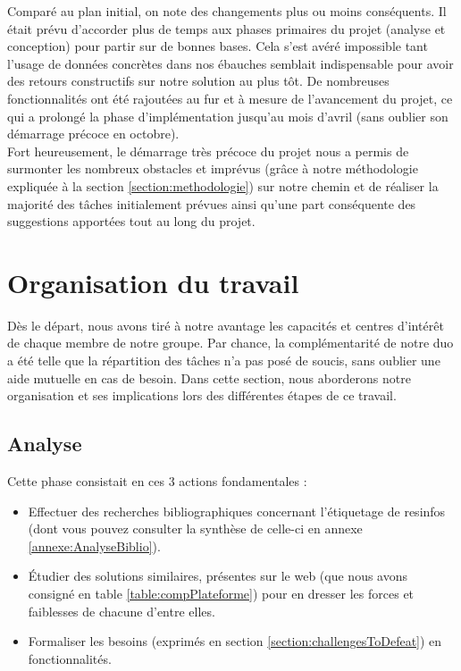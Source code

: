 Comparé au plan initial, on note des changements plus ou moins conséquents. Il était prévu d'accorder plus de temps aux phases primaires du projet (analyse et conception) pour partir sur de bonnes bases. Cela s'est avéré impossible tant l'usage de données concrètes dans nos ébauches semblait indispensable pour avoir des retours constructifs sur notre solution au plus tôt. De nombreuses fonctionnalités ont été rajoutées au fur et à mesure de l'avancement du projet, ce qui a prolongé la phase d'implémentation jusqu'au mois d'avril (sans oublier son démarrage précoce en octobre). \\

Fort heureusement, le démarrage très précoce du projet nous a permis de surmonter les nombreux obstacles et imprévus (grâce à notre méthodologie expliquée à la section \ref{section:methodologie}) sur notre chemin et de réaliser la majorité des tâches initialement prévues ainsi qu'une part conséquente des suggestions apportées tout au long du projet. \\


\section{Organisation du travail}

Dès le départ, nous avons tiré à notre avantage les capacités et centres d'intérêt de chaque membre de notre groupe. Par chance, la complémentarité de notre duo a été telle que la répartition des tâches n'a pas posé de soucis, sans oublier une aide mutuelle en cas de besoin. Dans cette section, nous aborderons notre organisation et ses implications lors des différentes étapes de ce travail.\\

\subsection*{Analyse}

Cette phase consistait en ces 3 actions fondamentales :
\begin{itemize}
    \item Effectuer des recherches bibliographiques concernant l'étiquetage de \glspl{resinfo} (dont vous pouvez consulter la synthèse de celle-ci en annexe \ref{annexe:AnalyseBiblio}).
    \item Étudier des solutions similaires, présentes sur le web (que nous avons consigné en table \ref{table:compPlateforme}) pour en dresser les forces et faiblesses de chacune d'entre elles.
    \item Formaliser les besoins (exprimés en section \ref{section:challengesToDefeat}) en fonctionnalités.
\end{itemize}

